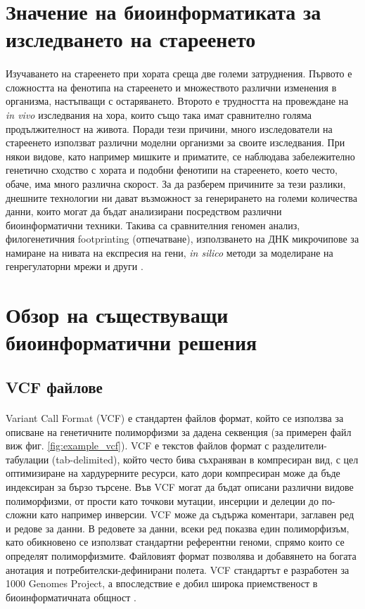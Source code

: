\documentclass[pdftex,cyrillic,14pt,a4page,twoside,openright]{extreport}
\begin{document}
\section[Значение на биоинформатиката за изследването на стареенето]{Значение на биоинформатиката за\\ изследването на стареенето}
\paragraph{}
Изучаването на стареенето при хората среща две големи затруднения. Първото е сложността на фенотипа на стареенето и множеството различни изменения в организма, настъпващи с остаряването. Второто е трудността на провеждане на \textit{in vivo} изследвания на хора, които също така имат сравнително голяма продължителност на живота. Поради тези причини, много изследователи на стареенето използват различни моделни организми за своите изследвания. При някои видове, като например мишките и приматите, се наблюдава забележително генетично сходство с хората и подобни фенотипи на стареенето, което често, обаче, има много различна скорост. За да разберем причините за тези разлики, днешните технологии ни дават възможност за генерирането на големи количества данни, които могат да бъдат анализирани посредством различни биоинформатични техники. Такива са сравнителния геномен анализ, филогенетичния footprinting (отпечатване), използването на ДНК микрочипове за намиране на нивата на експресия на гени, \textit{in silico} методи за моделиране на генрегулаторни мрежи и други \cite{demagalhaes2004}.
 
\section[Обзор на съществуващи биоинформатични решения]{Обзор на съществуващи\\ биоинформатични решения}
\subsection{VCF файлове}
\paragraph{}
Variant Call Format (VCF) е стандартен файлов формат, който се използва за описване на генетичните полиморфизми за дадена секвенция (за примерен файл виж фиг. \ref{fig:example_vcf}). VCF е текстов файлов формат с разделители-табулации (tab-delimited), който често бива съхраняван в компресиран вид, с цел оптимизиране на хардурерните ресурси, като дори компресиран може да бъде индексиран за бързо търсене. Във VCF могат да бъдат описани различни видове полиморфизми, от прости като точкови мутации, инсерции и делеции до по-сложни като например инверсии. VCF може да съдържа коментари, заглавен ред и редове за данни. В редовете за данни, всеки ред показва един полиморфизъм, като обикновено се използват стандартни референтни геноми, спрямо които се определят полиморфизмите. Файловият формат позволява и добавянето на богата анотация и потребителски-дефинирани полета. VCF стандартът е разработен за 1000 Genomes Project, а впоследствие е добил широка приемственост в биоинформатичната общност \cite{danecek2011}.
\end{document}
